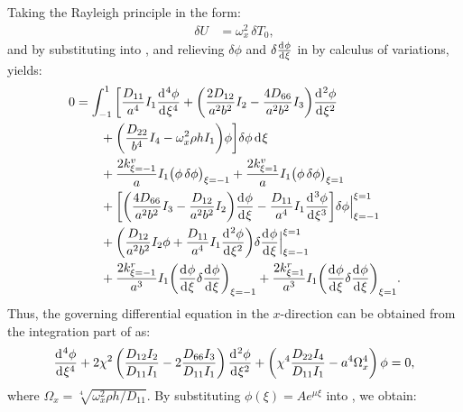 \documentclass[preprint,12pt,number]{elsarticle}
\newcommand{\id}{\mathrm{d}\mkern1mu}
\begin{document}
Taking the Rayleigh principle in the form:
%
\begin{equation}\label{eq:Rayleighx}
\begin{split}
	\delta U &= \omega_x^2 \, \delta T_0,
\end{split}
\end{equation}
%
and by substituting  into , and relieving $\delta \phi$ and $\delta\frac{\id  \phi}{\id \xi}$ in  by calculus of variations, yields:
%
\begin{equation}\label{eq:Rayleighx2}
\begin{split}
	0 &= \int_{-1}^{1} \bigg[ \frac{D_{11}}{a^4} I_1 \frac{\id^4 \phi}{\id \xi^4} 
	+ \bigg( \frac{2D_{12}}{a^2b^2} I_2 - \frac{4D_{66}}{a^2b^2} I_3 \bigg) \frac{\id^2 \phi}{\id \xi^2} \\
	&\qquad + \bigg( \frac{D_{22}}{b^4} I_4 - \omega_x^2 \rho h I_1 \bigg) \phi \bigg] \delta \phi \, \id \xi \\
	&\qquad + \frac{2k^v_{\xi=-1}}{a} I_1 \big(\phi\, \delta \phi\big)_{\xi=-1} 
	+ \frac{2k^v_{\xi=1}}{a} I_1 \big(\phi\, \delta \phi\big)_{\xi=1} \\
	&\qquad + \bigg[ \bigg( \frac{4D_{66}}{a^2b^2} I_3 - \frac{D_{12}}{a^2b^2} I_2 \bigg) \frac{\id \phi}{\id \xi} 
	- \frac{D_{11}}{a^4} I_1 \frac{\id^3 \phi}{\id \xi^3} \bigg] \delta \phi \Big|^{\xi=1}_{\xi=-1} \\
	&\qquad + \bigg( \frac{D_{12}}{a^2b^2} I_2 \phi + \frac{D_{11}}{a^4} I_1 \frac{\id^2 \phi}{\id \xi^2} \bigg) 
	\delta\frac{\id  \phi}{\id \xi} \Big|^{\xi=1}_{\xi=-1} \\
	&\qquad + \frac{2k^r_{\xi=-1}}{a^3} I_1 \bigg(\frac{\id \phi}{\id \xi}\delta \frac{\id \phi}{\id \xi}\bigg)_{\xi=-1} 
	+ \frac{2k^r_{\xi=1}}{a^3} I_1 \bigg(\frac{\id \phi}{\id \xi} \delta\frac{\id \phi}{\id \xi}\bigg)_{\xi=1}.
\end{split}
\end{equation}
%
Thus, the governing differential equation in the $ x $-direction can be obtained from the integration part of  as:
%
\begin{equation}\label{eq:ODEx}
\frac{\id^4 \phi}{\id \xi^4}+ 2\chi^2\left(\frac{D_{12}I_2}{D_{11}I_1}-2\frac{D_{66}I_3}{D_{11}I_1}\right)\frac{\id^2 \phi}{\id \xi^2}+\left(\chi^4\frac{D_{22}I_4}{D_{11}I_1}-a^4\Omega_x^4\right)\phi=0,
\end{equation}
%
where $\Omega_x = \sqrt[4]{\omega_x^2 \rho h / D_{11}}$.
By substituting $\phi(\xi) = A e^{\mu \xi}$ into , we obtain:
\end{document}
